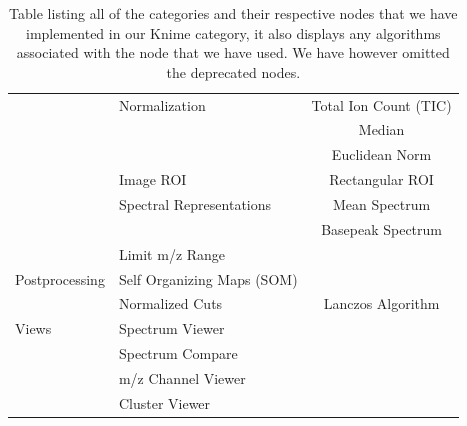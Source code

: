 \documentclass[11pt,openany]{book}
\begin{document}
\begin{table}
{\begin{tabular}{|l|lc|}
                                       & Normalization              & Total Ion Count (TIC)                                                \\
                                       &                            & Median                                                               \\
                                       &                            & Euclidean Norm                                                       \\ \cline{2-3} 
                                       & Image ROI                  & Rectangular ROI                                                      \\ \cline{2-3} 
                                       & Spectral Representations & Mean Spectrum \\
                                       & & Basepeak Spectrum \\
                                       \cline{2-3}
                                       & Limit m/z Range            &                                                                      \\ \hline
        Postprocessing                 & Self Organizing Maps (SOM)      &                                                                      \\ \cline{2-3} 
                                       & Normalized Cuts            & Lanczos Algorithm                                                    \\ \hline
        Views                          & Spectrum Viewer            &                                                                      \\
                                       & Spectrum Compare           &                                                                      \\
                                       & m/z Channel Viewer         &                                                                      \\
                                       & Cluster Viewer             &                                                                      \\ \hline
        \end{tabular}
    }
   
    \caption{Table listing all of the categories and their respective nodes that we have implemented in our Knime category, it also displays any algorithms associated with the node that we have used. We have however omitted the deprecated nodes.}
    \label{table:Nodes_In_Our_Category}
\end{table}
\end{document}
